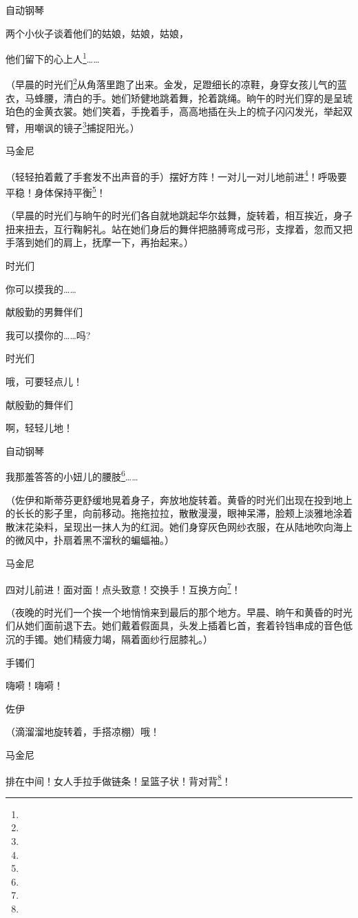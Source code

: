 \par 自动钢琴
\par 两个小伙子谈着他们的姑娘，姑娘，姑娘，
\par 他们留下的心上人\footnote{}……
\par （早晨的时光们\footnote{}从角落里跑了出来。金发，足蹬细长的凉鞋，身穿女孩儿气的蓝衣，马蜂腰，清白的手。她们矫健地跳着舞，抡着跳绳。晌午的时光们穿的是呈琥珀色的金黄衣裳。她们笑着，手挽着手，高高地插在头上的梳子闪闪发光，举起双臂，用嘲讽的镜子\footnote{}捕捉阳光。）
\par 马金尼
\par （轻轻拍着戴了手套发不出声音的手）摆好方阵！一对儿一对儿地前进\footnote{}！呼吸要平稳！身体保持平衡\footnote{}！
\par （早晨的时光们与晌午的时光们各自就地跳起华尔兹舞，旋转着，相互挨近，身子扭来扭去，互行鞠躬礼。站在她们身后的舞伴把胳膊弯成弓形，支撑着，忽而又把手落到她们的肩上，抚摩一下，再抬起来。）
\par 时光们
\par 你可以摸我的……
\par 献殷勤的男舞伴们
\par 我可以摸你的……吗?
\par 时光们
\par 哦，可要轻点儿！
\par 献殷勤的舞伴们
\par 啊，轻轻儿地！
\par 自动钢琴
\par 我那羞答答的小妞儿的腰肢\footnote{}……
\par （佐伊和斯蒂芬更舒缓地晃着身子，奔放地旋转着。黄昏的时光们出现在投到地上的长长的影子里，向前移动。拖拖拉拉，散散漫漫，眼神呆滞，脸颊上淡雅地涂着散沫花染料，呈现出一抹人为的红润。她们身穿灰色网纱衣服，在从陆地吹向海上的微风中，扑扇着黑不溜秋的蝙蝠袖。）
\par 马金尼
\par 四对儿前进！面对面！点头致意！交换手！互换方向\footnote{}！
\par （夜晚的时光们一个挨一个地悄悄来到最后的那个地方。早晨、晌午和黄昏的时光们从她们面前退下去。她们戴着假面具，头发上插着匕首，套着铃铛串成的音色低沉的手镯。她们精疲力竭，隔着面纱行屈膝礼。）
\par 手镯们
\par 嗨嗬！嗨嗬！
\par 佐伊
\par （滴溜溜地旋转着，手搭凉棚）哦！
\par 马金尼
\par 排在中间！女人手拉手做链条！呈篮子状！背对背\footnote{}！
